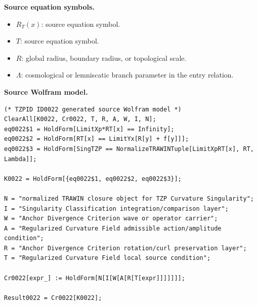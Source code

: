 \begin{minipage}[t]{0.49\linewidth}
\begingroup
\small
\raggedright
\textbf{Source equation symbols.}\par
\begin{itemize}[leftmargin=1.35em,itemsep=1pt,topsep=1pt,parsep=0pt]
    \item $R_{T}(x)$: source equation symbol.
    \item $T$: source equation symbol.
    \item $R$: global radius, boundary radius, or topological scale.
    \item $\Lambda$: cosmological or lemniscatic branch parameter in the entry relation.
\end{itemize}
\endgroup
\end{minipage}\hfill
\begin{minipage}[t]{0.47\linewidth}
\begingroup
\scriptsize
\raggedright
\textbf{Source Wolfram model.}\par
\begin{Verbatim}[fontsize=\tiny,breaklines=true,breakanywhere=true]
(* TZPID ID0022 generated source Wolfram model *)
ClearAll[K0022, Cr0022, T, R, A, W, I, N];
eq0022$1 = HoldForm[LimitXp*RT[x] == Infinity];
eq0022$2 = HoldForm[RT[x] == LimitYx[R[y] + f[y]]];
eq0022$3 = HoldForm[SingTZP == NormalizeTRAWINTuple[LimitXpRT[x], RT, Lambda]];

K0022 = HoldForm[{eq0022$1, eq0022$2, eq0022$3}];

N = "normalized TRAWIN closure object for TZP Curvature Singularity";
I = "Singularity Classification integration/comparison layer";
W = "Anchor Divergence Criterion wave or operator carrier";
A = "Regularized Curvature Field admissible action/amplitude condition";
R = "Anchor Divergence Criterion rotation/curl preservation layer";
T = "Regularized Curvature Field local source condition";

Cr0022[expr_] := HoldForm[N[I[W[A[R[T[expr]]]]]]];

Result0022 = Cr0022[K0022];
\end{Verbatim}
\endgroup
\end{minipage}

